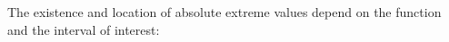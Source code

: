 \documentclass[cal1spr16Lectures.tex]{subfiles}
\begin{document}
\begin{frame}
\footnotesize
The existence and location of absolute extreme values depend on the function and the interval of interest:
\begin{columns}[T]
\begin{column}{.5\textwidth}
\begin{block}{}
\end{block}
\end{column}
\begin{column}{.5\textwidth}
\begin{block}{}
\end{block}
\end{column}
\end{columns}
\end{frame}
\end{document}
